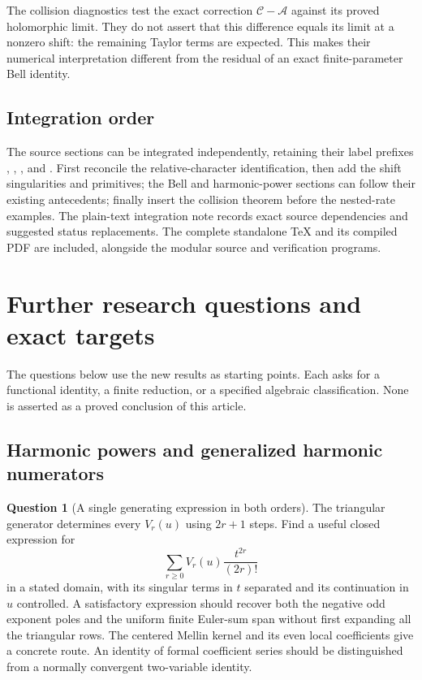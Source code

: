 \documentclass[11pt,a4paper]{article}
\numberwithin{equation}{section}
\theoremstyle{definition}
\newtheorem{question}[theorem]{Question}
\theoremstyle{remark}
\newcommand{\src}[1]{\texttt{\detokenize{#1}}}
\begin{document}
The collision diagnostics test the exact correction
$\mathcal C-\mathcal A$ against its proved holomorphic limit.
They do not assert that this difference equals its limit at a nonzero
shift: the remaining Taylor terms are expected. This makes their
numerical interpretation different from the residual of an exact
finite-parameter Bell identity.

\subsection{Integration order}

The source sections can be integrated independently, retaining their
label prefixes \src{hsh:}, \src{bell:}, \src{hpnew:}, and \src{hc:}.
First reconcile the relative-character identification, then add the
shift singularities and primitives; the Bell and harmonic-power
sections can follow their existing antecedents; finally insert the
collision theorem before the nested-rate examples. The plain-text
integration note records exact source dependencies and suggested
status replacements. The complete standalone TeX and its compiled PDF
are included, alongside the modular source and verification programs.


\section{Further research questions and exact targets}
\label{sec:research}

The questions below use the new results as starting points. Each asks
for a functional identity, a finite reduction, or a specified algebraic
classification. None is asserted as a proved conclusion of this article.

\subsection{Harmonic powers and generalized harmonic numerators}

\begin{question}[A single generating expression in both orders]
The triangular generator determines every $V_r(u)$ using $2r+1$
steps. Find a useful closed expression for
\[
 \sum_{r\ge0}V_r(u)\frac{t^{2r}}{(2r)!}
\]
in a stated domain, with its singular terms in $t$ separated and its
continuation in $u$ controlled. A satisfactory expression should
recover both the negative odd exponent poles and the uniform finite
Euler-sum span without first expanding all the triangular rows.
The centered Mellin kernel and its even local coefficients give a
concrete route. An identity of formal coefficient series should be
distinguished from a normally convergent two-variable identity.
\end{question}
\end{document}
